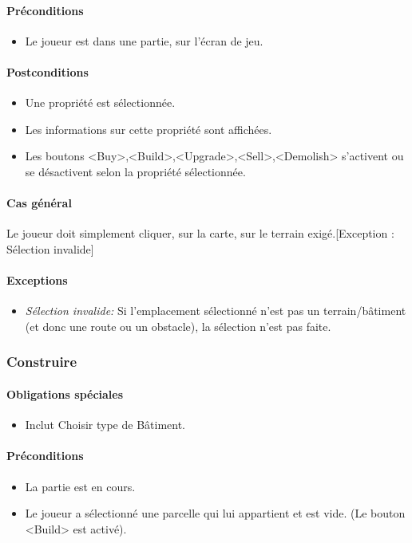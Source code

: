 \documentclass[a4paper,11pt]{report}
\begin{document}
\paragraph{Préconditions}
\begin{itemize}
	\item Le joueur est dans une partie, sur l'écran de jeu.
\end{itemize}
\paragraph{Postconditions}
\begin{itemize}
	\item Une propriété est sélectionnée.
	\item Les informations sur cette propriété sont affichées.
	\item Les boutons <Buy>,<Build>,<Upgrade>,<Sell>,<Demolish> s'activent ou se désactivent selon la propriété sélectionnée.
\end{itemize}
\paragraph{Cas général}
Le joueur doit simplement cliquer, sur la carte, sur le terrain exigé.[Exception : Sélection invalide]
\paragraph{Exceptions}
\begin{itemize}
	\item \textit{Sélection invalide:} Si l'emplacement sélectionné n'est pas un terrain/bâtiment (et donc une route ou un obstacle), la sélection n'est pas faite.
\end{itemize}

\subsubsection{Construire}
\paragraph{Obligations spéciales}
\begin{itemize}
 \item Inclut Choisir type de Bâtiment.
\end{itemize}
\paragraph{Préconditions}
\begin{itemize}
 \item La partie est en cours.
 \item Le joueur a sélectionné une parcelle qui lui appartient et est vide. (Le bouton <Build> est activé).
\end{itemize}
\end{document}
